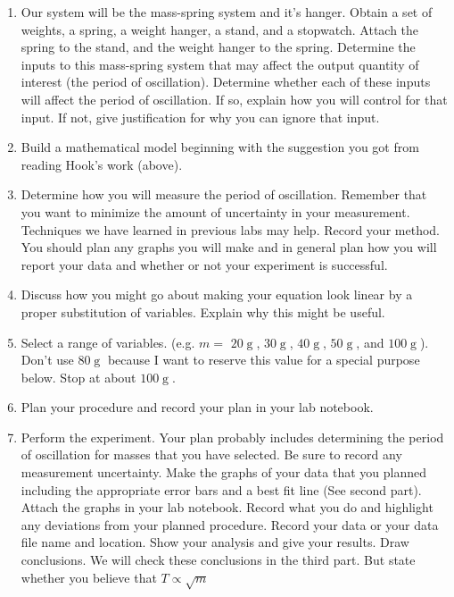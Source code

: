 \documentclass[twoside,11pt,ShortChapTitles]{BYUTextbook}
\begin{document}
\begin{enumerate}
\item Our system will be the mass-spring system and it's hanger. Obtain a set
of weights, a spring, a weight hanger, a stand, and a stopwatch. Attach the
spring to the stand, and the weight hanger to the spring. Determine the inputs
to this mass-spring system that may affect the output quantity of interest
(the period of oscillation). Determine whether each of these inputs will
affect the period of oscillation. If so, explain how you will control for that
input. If not, give justification for why you can ignore that input.

\item Build a mathematical model beginning with the suggestion you got from
reading Hook's work (above).

\item Determine how you will measure the period of oscillation. Remember that
you want to minimize the amount of uncertainty in your measurement. Techniques
we have learned in previous labs may help. Record your method. You should plan
any graphs you will make and in general plan how you will report your data and
whether or not your experiment is successful.

\item Discuss how you might go about making your equation look linear by a
proper substitution of variables. Explain why this might be useful.

\item Select a range of variables. (e.g. $m=$ $20
\operatorname{g}
$, $30
\operatorname{g}
$, $40
\operatorname{g}
$, $50
\operatorname{g}
$, and $100
\operatorname{g}
$). Don't use $80
\operatorname{g}
$ because I want to reserve this value for a special purpose below. Stop at
about $100
\operatorname{g}
.$

\item Plan your procedure and record your plan in your lab notebook.

\item Perform the experiment. Your plan probably includes determining the
period of oscillation for masses that you have selected. Be sure to record any
measurement uncertainty. Make the graphs of your data that you planned
including the appropriate error bars and a best fit line (See second part). Attach the graphs in your lab notebook.
Record what you do and highlight any deviations from your planned procedure.
Record your data or your data file name and location. Show your analysis and
give your results. Draw conclusions. We will check these conclusions in the
third part. But state whether you believe that $T\propto\sqrt{m}$
\end{enumerate}
\end{document}

